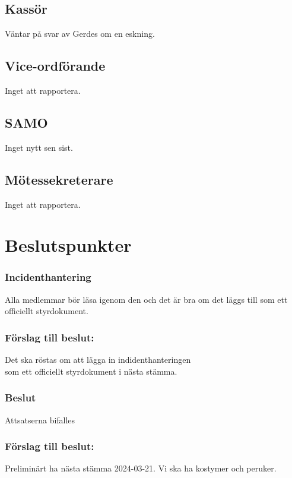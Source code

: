\documentclass[protokoll]{dvd}
\begin{document}
\subsection{Kassör}
Väntar på svar av Gerdes om en eskning.

\subsection{Vice-ordförande}
Inget att rapportera.

\subsection{SAMO}
Inget nytt sen sist.

\subsection{Mötessekreterare}
Inget att rapportera.

\newpage

\section{Beslutspunkter}

\subsubsection*{Incidenthantering}
Alla medlemmar bör läsa igenom den och det är bra om det läggs till som ett officiellt styrdokument.

\subsubsection*{Förslag till beslut:}
\begin{attsatser}
    \item Det ska röstas om att lägga in indidenthanteringen\\ som ett officiellt styrdokument i nästa stämma.
\end{attsatser}

\subsubsection*{Beslut}
\begin{attsatser}
    \item Attsatserna bifalles
\end{attsatser}

\subsubsection*{Förslag till beslut:}
\begin{attsatser}
    \item Preliminärt ha nästa stämma 2024-03-21. Vi ska ha kostymer och peruker.
\end{attsatser}
\end{document}
